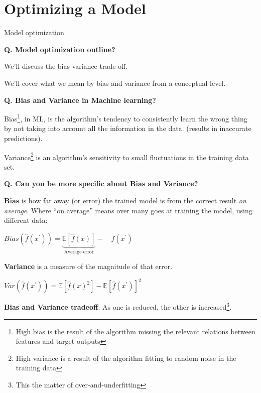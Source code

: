 \section{Optimizing a Model}
\begin{transitionframe}
  \begin{center}
    \Huge Model optimization
  \end{center}
\end{transitionframe}

\begin{frame}[fragile]{\textbf{Q. Model optimization outline?}}
  \begin{wideitemize}
    \item We'll discuss the bias-variance trade-off.
    \item We'll cover what we mean by bias and variance from a conceptual level.
  \end{wideitemize}
\end{frame}

\begin{frame}[fragile]{\textbf{Q. Bias and Variance in Machine learning?}}
  \begin{wideitemize}
    \item Bias\footnote{High bias is the result of the algorithm missing the
    relevant relations between features and target outputs}, in ML, is the algorithm's
    tendency to consistently learn the wrong thing by not taking into account
    all the information in the data. (results in inaccurate predictions).
    \item Variance\footnote{High variance is a result of the algorithm fitting to
    random noise in the training data} is an algorithm's sensitivity
    to small fluctuations in the training data set.
  \end{wideitemize}
\end{frame}

\begin{frame}[fragile]{\textbf{Q. Can you be more specific about Bias and Variance?}}
  \begin{wideitemize}
    \item \textbf{Bias} is how far away (or error) the trained model is from the correct
    result \textit{on average}. Where ``on average'' means over many goes at
    training the model, using different data:
    \begin{wideitemize}
    \item $Bias(\hat{f}(x^{'})) = \underbrace{\mathbb{E}[\hat{f}(x)]}_{\text{Average error}} - \quad f(x^{'})$
    \end{wideitemize}
    \item \textbf{Variance} is a measure of the magnitude of that error.
    \begin{wideitemize}
    \item $Var(\hat{f}(x^{'})) = \mathbb{E}[\hat{f}(x)^{2}] - \mathbb{E}[\hat{f}(x^{'})]^{2}$
    \end{wideitemize}
    \item \textbf{Bias and Variance tradeoff}: As one is reduced,
    the other is increased\footnote{This the matter of over-and-underfitting}.
  \end{wideitemize}
\end{frame}

